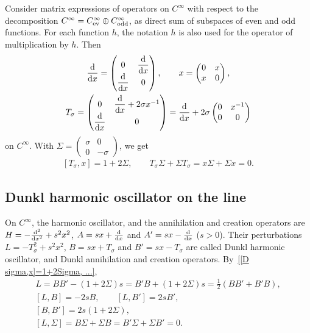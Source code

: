 \documentclass[11pt]{article}
\newcommand{\Cinf}{C^\infty}
\begin{document}
Consider matrix expressions of operators on $\Cinf$ with respect to the decomposition $\Cinf=\Cinf_{\text{\rm ev}}\oplus\Cinf_{\text{\rm odd}}$, as direct sum of subspaces of even and odd functions. For each function $h$, the notation $h$ is also used for the operator of multiplication by $h$. Then
  \begin{gather*}
    \frac{{\rm d}}{{\rm d}x}=
      \begin{pmatrix}
        0 &  \dfrac{{\rm d}}{{\rm d}x} \\
        \dfrac{{\rm d}}{{\rm d}x} & 0
      \end{pmatrix} ,\qquad
    x=
      \begin{pmatrix}
        0 &  x \\
        x & 0
      \end{pmatrix} ,\\
    T_\sigma=
      \begin{pmatrix}
        0 &  \dfrac{{\rm d}}{{\rm d}x}+2\sigma x^{-1} \\
        \dfrac{{\rm d}}{{\rm d}x} & 0
      \end{pmatrix}
    = \frac{{\rm d}}{{\rm d}x}+2\sigma
      \begin{pmatrix}
        0 &  x^{-1} \\
        0 & 0
      \end{pmatrix}
  \end{gather*}
on $\Cinf$. With
$
  \Sigma=
    \begin{pmatrix}
      \sigma & 0 \\
      0 & -\sigma
    \end{pmatrix}
$,
we get
  \begin{gather}\label{[D sigma,x]=1+2Sigma, ...}
    [T_\sigma,x]=1+2\Sigma ,\qquad
    T_\sigma\Sigma+\Sigma T_\sigma=x \Sigma+\Sigma x=0 .
  \end{gather}

\subsection{Dunkl harmonic oscillator on the line}\label{ss:L}

On $\Cinf$, the harmonic oscillator, and the annihilation and creation operators are $H=-\frac{{\rm d}^2}{{\rm d}x^2}+s^2x^2$, $A=sx+\frac{{\rm d}}{{\rm d}x}$ and $A'=sx-\frac{{\rm d}}{{\rm d}x}$ ($s>0$). Their perturbations $L=-T_\sigma^2+s^2x^2$, $B=sx+T_\sigma$ and $B'=sx-T_\sigma$ are called Dunkl harmonic oscillator, and Dunkl annihilation and creation operators. By~\eqref{[D sigma,x]=1+2Sigma, ...},
  \begin{gather}
    L=BB'-(1+2\Sigma)s=B'B+(1+2\Sigma)s=\frac{1}{2}(BB'+B'B) ,\label{L}\\
    [L,B]=-2sB ,\qquad[L,B']=2sB' ,\label{[L,B]}\\
    [B,B']=2s(1+2\Sigma) ,\label{[B,B']}\\
    [L,\Sigma]=B\Sigma+\Sigma B=B'\Sigma+\Sigma B'=0 .
    \label{[L,Sigma]=B' Sigma+Sigma B'=0}
  \end{gather}
\end{document}
